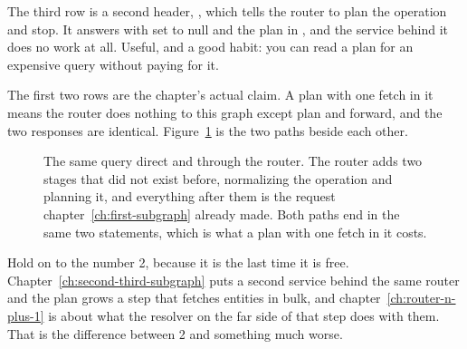 %
The third row is a second header, , which tells the
router to plan the operation and stop. It answers with  set to null
and the plan in , and the service behind it does no work at
all. Useful, and a good habit: you can read a plan for an expensive query
without paying for it.

%
The first two rows are the chapter's actual claim. A plan with one fetch in it
means the router does nothing to this graph except plan and forward, and the
two responses are identical. Figure~\ref{fig:ch08-one-fetch} is the two paths
beside each other.

\begin{figure}[htbp]
  \centering
  
  \caption{The same query direct and through the router. The router adds two
  stages that did not exist before, normalizing the operation and planning it,
  and everything after them is the request chapter~\ref{ch:first-subgraph}
  already made. Both paths end in the same two statements, which is what a plan
  with one fetch in it costs.}
  \label{fig:ch08-one-fetch}
\end{figure}

%
Hold on to the number 2, because it is the last time it is free.
Chapter~\ref{ch:second-third-subgraph} puts a second service behind the same
router and the plan grows a step that fetches entities in bulk, and
chapter~\ref{ch:router-n-plus-1} is about what the resolver on the far side of
that step does with them. That is the difference between 2 and something much
worse.
%
